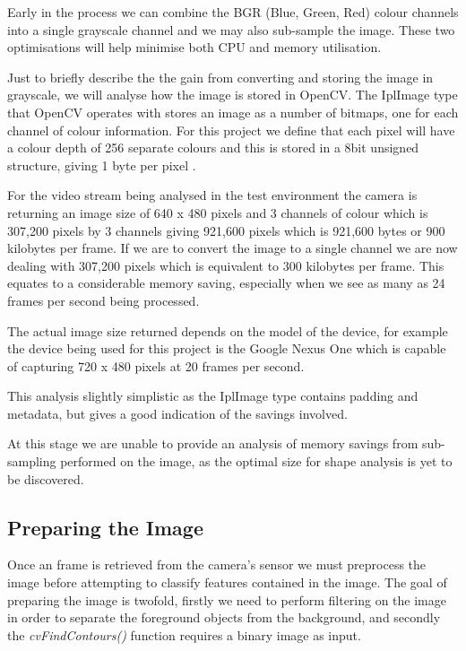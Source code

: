 Early in the process we can combine the BGR (Blue, Green, Red) colour channels into a single grayscale channel and we may also sub-sample the image. These two optimisations will help minimise both CPU and memory utilisation.

Just to briefly describe the the gain from converting and storing the image in grayscale, we will analyse how the image is stored in OpenCV. The IplImage type that OpenCV operates with stores an image as a number of bitmaps, one for each channel of colour information. For this project we define that each pixel will have a colour depth of 256 separate colours and this is stored in a 8bit unsigned structure, giving 1 byte per pixel \cite{morganIPL06}.

For the video stream being analysed in the test environment the camera is returning an image size of 640 x 480 pixels and 3 channels of colour which is 307,200 pixels by 3 channels giving 921,600 pixels which is 921,600 bytes or 900 kilobytes per frame.  If we are to convert the image to a single channel we are now dealing with 307,200 pixels which is equivalent to 300 kilobytes per frame. This equates to a considerable memory saving, especially when we see as many as 24 frames per second being processed.

The actual image size returned depends on the model of the device, for example the device being used for this project is the Google Nexus One which is capable of capturing 720 x 480 pixels at 20 frames per second.

This analysis slightly simplistic as the IplImage type contains padding and metadata, but gives a good indication of the savings involved.

At this stage we are unable to provide an analysis of memory savings from sub-sampling performed on the image, as the optimal size for shape analysis is yet to be discovered.


\subsection{Preparing the Image}

Once an frame is retrieved from the camera’s sensor we must preprocess the image before attempting to classify features contained in the image. The goal of preparing the image is twofold, firstly we need to perform filtering on the image in order to separate the foreground objects from the background, and secondly the \emph{cvFindContours()} function requires a binary image as input.


